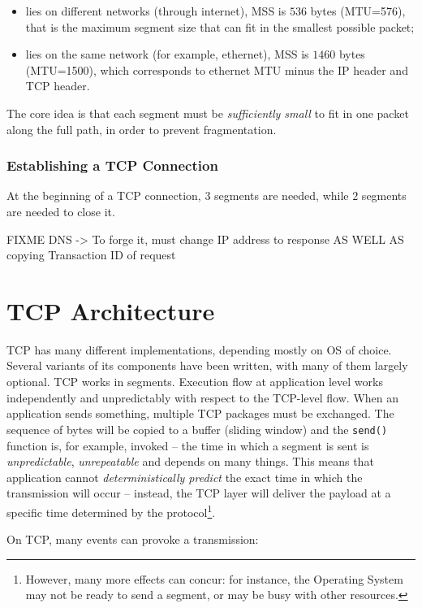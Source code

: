 \documentclass[a4paper, 11pt]{report}
\begin{document}
\begin{itemize}
    \item lies on different networks (through internet), MSS is $536$ bytes
        (MTU=576), that is the maximum segment size that can fit in the
        smallest possible packet;
    \item lies on the same network (for example, ethernet), MSS is $1460$ bytes
        (MTU=1500), which corresponds to ethernet MTU minus the IP header and
        TCP header.
\end{itemize}

The core idea is that each segment must be \emph{sufficiently small} to fit in
one packet along the full path, in order to prevent fragmentation.

\subsubsection{Establishing a TCP Connection}

At the beginning of a TCP connection, $3$ segments are needed, while $2$
segments are needed to close it.

FIXME DNS -> To forge it, must change IP address to
response AS WELL AS copying Transaction ID of request

\section{TCP Architecture}

TCP has many different implementations, depending mostly on OS of choice.
Several variants of its components have been written, with many of them largely
optional. TCP works in segments. Execution flow at application level works
independently and unpredictably with respect to the TCP-level flow. When an
application sends something, multiple TCP packages must be exchanged. The
sequence of bytes will be copied to a buffer (sliding window) and the
\texttt{send()} function is, for example, invoked \--- the time in which a
segment is sent is \emph{unpredictable}, \emph{unrepeatable} and depends on
many things. This means that application cannot \emph{deterministically
predict} the exact time in which the transmission will occur \--- instead, the
TCP layer will deliver the payload at a specific time determined by the
protocol\footnote{However, many more effects can concur: for instance, the
Operating System may not be ready to send a segment, or may be busy with other
resources.}.

On TCP, many events can provoke a transmission:
\end{document}
